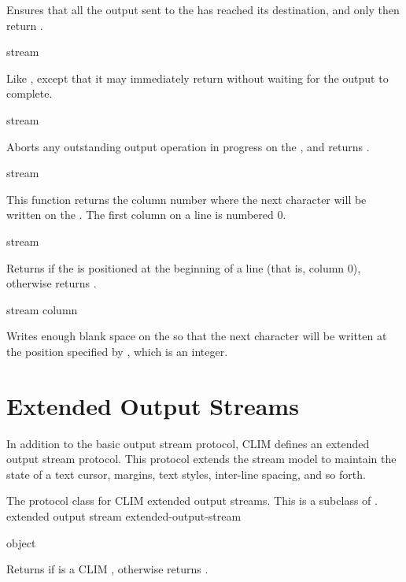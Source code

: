 Ensures that all the output sent to the   has
reached its destination, and only then return .

 {stream}

Like , except that it may immediately return
 without waiting for the output to complete.

 {stream}

Aborts any outstanding output operation in progress on the 
, and returns .

 {stream}

This function returns the column number where the next character will be written
on the  .  The first column on a line is
numbered 0.

 {stream}

Returns  if the   is positioned at
the beginning of a line (that is, column 0), otherwise returns .

 {stream column}

Writes enough blank space on the   so that the
next character will be written at the position specified by , which
is an integer.


\section {Extended Output Streams}

In addition to the basic output stream protocol, CLIM defines an extended output
stream protocol.  This protocol extends the stream model to maintain the state
of a text cursor, margins, text styles, inter-line spacing, and so forth.


The protocol class for CLIM extended output streams.  This is a subclass of
.
 {extended output stream} {extended-output-stream}

 {object}

Returns  if  is a CLIM ,
otherwise returns .


